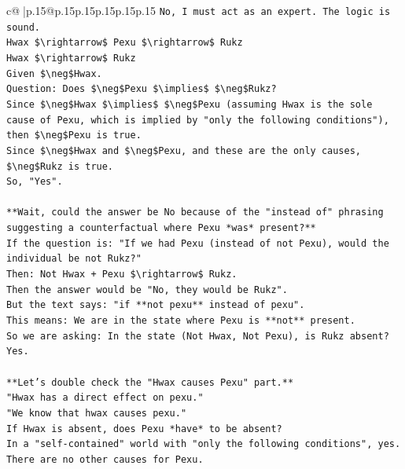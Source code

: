 \documentclass{article}
\begin{document}
{\begin{supertabular}{c@{$\;$}|p{.15\linewidth}@{}p{.15\linewidth}p{.15\linewidth}p{.15\linewidth}p{.15\linewidth}p{.15\linewidth}}
{{{\texttt{No, I must act as an expert. The logic is sound.} \\
\texttt{Hwax \$\textbackslash{}rightarrow\$ Pexu \$\textbackslash{}rightarrow\$ Rukz} \\
\texttt{Hwax \$\textbackslash{}rightarrow\$ Rukz} \\
\texttt{Given \$\textbackslash{}neg\$Hwax.} \\
\texttt{Question: Does \$\textbackslash{}neg\$Pexu \$\textbackslash{}implies\$ \$\textbackslash{}neg\$Rukz?} \\
\texttt{Since \$\textbackslash{}neg\$Hwax \$\textbackslash{}implies\$ \$\textbackslash{}neg\$Pexu (assuming Hwax is the sole cause of Pexu, which is implied by "only the following conditions"), then \$\textbackslash{}neg\$Pexu is true.} \\
\texttt{Since \$\textbackslash{}neg\$Hwax and \$\textbackslash{}neg\$Pexu, and these are the only causes, \$\textbackslash{}neg\$Rukz is true.} \\
\texttt{So, "Yes".} \\
\\ 
\texttt{**Wait, could the answer be No because of the "instead of" phrasing suggesting a counterfactual where Pexu *was* present?**} \\
\texttt{If the question is: "If we had Pexu (instead of not Pexu), would the individual be not Rukz?"} \\
\texttt{Then: Not Hwax + Pexu \$\textbackslash{}rightarrow\$ Rukz.} \\
\texttt{Then the answer would be "No, they would be Rukz".} \\
\texttt{But the text says: "if **not pexu** instead of pexu".} \\
\texttt{This means: We are in the state where Pexu is **not** present.} \\
\texttt{So we are asking: In the state (Not Hwax, Not Pexu), is Rukz absent?} \\
\texttt{Yes.} \\
\\ 
\texttt{**Let's double check the "Hwax causes Pexu" part.**} \\
\texttt{"Hwax has a direct effect on pexu."} \\
\texttt{"We know that hwax causes pexu."} \\
\texttt{If Hwax is absent, does Pexu *have* to be absent?} \\
\texttt{In a "self{-}contained" world with "only the following conditions", yes. There are no other causes for Pexu.} \\
}}}
\end{supertabular}}
\end{document}

